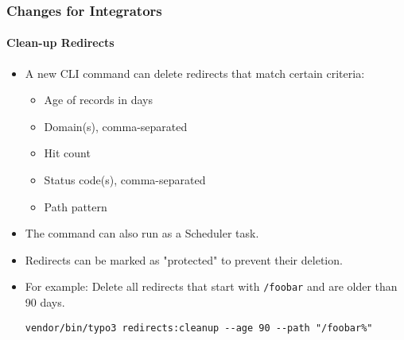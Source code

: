 %

\begin{frame}[fragile]
	\frametitle{Changes for Integrators}
	\framesubtitle{Clean-up Redirects}


	\begin{itemize}
		\item A new CLI command can delete redirects that match certain criteria:
			\begin{itemize}
				\item Age of records in days
				\item Domain(s), comma-separated
				\item Hit count
				\item Status code(s), comma-separated
				\item Path pattern
			\end{itemize}
		\item The command can also run as a Scheduler task.
		\item Redirects can be marked as "protected" to prevent their deletion.
		\item For example:\newline
			\smaller
				Delete all redirects that start with \texttt{/foobar} and are older than 90 days.
			\normalsize
\begin{lstlisting}
vendor/bin/typo3 redirects:cleanup --age 90 --path "/foobar%"
\end{lstlisting}

	\end{itemize}
\end{frame}

